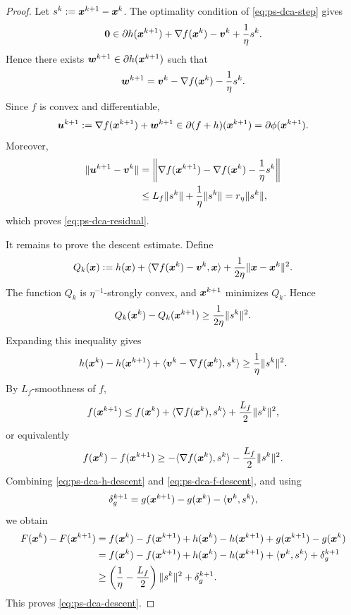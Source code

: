 \begin{proof}
Let $s^k:=\bm{x}^{k+1}-\bm{x}^k$. The optimality condition of
\eqref{eq:ps-dca-step} gives
\[
    \bm{0}
    \in
    \partial h(\bm{x}^{k+1})
    +
    \nabla f(\bm{x}^k)
    -
    \bm{v}^k
    +
    \frac{1}{\eta}s^k .
\]
Hence there exists $\bm{w}^{k+1}\in\partial h(\bm{x}^{k+1})$ such that
\[
    \bm{w}^{k+1}
    =
    \bm{v}^k
    -
    \nabla f(\bm{x}^k)
    -
    \frac{1}{\eta}s^k .
\]
Since $f$ is convex and differentiable,
\[
    \bm{u}^{k+1}
    :=
    \nabla f(\bm{x}^{k+1})+\bm{w}^{k+1}
    \in
    \partial(f+h)(\bm{x}^{k+1})
    =
    \partial\phi(\bm{x}^{k+1}).
\]
Moreover,
\[
\begin{aligned}
    \|\bm{u}^{k+1}-\bm{v}^k\|
    &=
    \left\|
        \nabla f(\bm{x}^{k+1})-\nabla f(\bm{x}^k)
        -
        \frac{1}{\eta}s^k
    \right\|
    \\
    &\le
    L_f\|s^k\|+\frac{1}{\eta}\|s^k\|
    =
    r_\eta\|s^k\|,
\end{aligned}
\]
which proves \eqref{eq:ps-dca-residual}.

It remains to prove the descent estimate. Define
\[
    Q_k(\bm{x})
    :=
    h(\bm{x})
    +
    \langle \nabla f(\bm{x}^k)-\bm{v}^k,\bm{x}\rangle
    +
    \frac{1}{2\eta}\|\bm{x}-\bm{x}^k\|^2 .
\]
The function $Q_k$ is $\eta^{-1}$-strongly convex, and
$\bm{x}^{k+1}$ minimizes $Q_k$. Hence
\[
    Q_k(\bm{x}^k)-Q_k(\bm{x}^{k+1})
    \ge
    \frac{1}{2\eta}\|s^k\|^2.
\]
Expanding this inequality gives
\begin{equation}
    h(\bm{x}^k)-h(\bm{x}^{k+1})
    +
    \langle \bm{v}^k-\nabla f(\bm{x}^k),s^k\rangle
    \ge
    \frac{1}{\eta}\|s^k\|^2 .
    \label{eq:ps-dca-h-descent}
\end{equation}
By $L_f$-smoothness of $f$,
\[
    f(\bm{x}^{k+1})
    \le
    f(\bm{x}^k)
    +
    \langle\nabla f(\bm{x}^k),s^k\rangle
    +
    \frac{L_f}{2}\|s^k\|^2,
\]
or equivalently
\begin{equation}
    f(\bm{x}^k)-f(\bm{x}^{k+1})
    \ge
    -\langle\nabla f(\bm{x}^k),s^k\rangle
    -
    \frac{L_f}{2}\|s^k\|^2 .
    \label{eq:ps-dca-f-descent}
\end{equation}
Combining \eqref{eq:ps-dca-h-descent} and
\eqref{eq:ps-dca-f-descent}, and using
\[
    \delta_g^{k+1}
    =
    g(\bm{x}^{k+1})-g(\bm{x}^k)-\langle\bm{v}^k,s^k\rangle,
\]
we obtain
\[
\begin{aligned}
    F(\bm{x}^k)-F(\bm{x}^{k+1})
    &=
    f(\bm{x}^k)-f(\bm{x}^{k+1})
    +
    h(\bm{x}^k)-h(\bm{x}^{k+1})
    +
    g(\bm{x}^{k+1})-g(\bm{x}^k)
    \\
    &=
    f(\bm{x}^k)-f(\bm{x}^{k+1})
    +
    h(\bm{x}^k)-h(\bm{x}^{k+1})
    +
    \langle\bm{v}^k,s^k\rangle
    +
    \delta_g^{k+1}
    \\
    &\ge
    \left(
        \frac{1}{\eta}
        -
        \frac{L_f}{2}
    \right)
    \|s^k\|^2
    +
    \delta_g^{k+1}.
\end{aligned}
\]
This proves \eqref{eq:ps-dca-descent}.
\end{proof}

